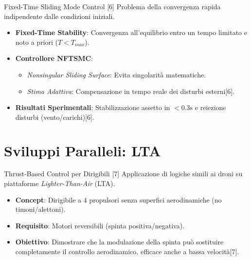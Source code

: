\documentclass[aspectratio=169]{beamer}
\begin{document}
\begin{frame}{Fixed-Time Sliding Mode Control [6]}
    Problema della convergenza rapida indipendente dalle condizioni iniziali.
    \vspace{0.3cm}
    \begin{itemize}
        \item \textbf{Fixed-Time Stability}: Convergenza all'equilibrio entro un tempo limitato e noto a priori ($T < T_{max}$).
        \item \textbf{Controllore NFTSMC}:
        \begin{itemize}
            \item \textit{Nonsingular Sliding Surface}: Evita singolarità matematiche.
            \item \textit{Stima Adattiva}: Compensazione in tempo reale dei disturbi esterni[6].
        \end{itemize}
        \item \textbf{Risultati Sperimentali}: Stabilizzazione assetto in $< 0.3\text{s}$ e reiezione disturbi (vento/carichi)[6].
    \end{itemize}
\end{frame}

\section{Sviluppi Paralleli: LTA}

\begin{frame}{Thrust-Based Control per Dirigibili [7]}
    Applicazione di logiche simili ai droni su piattaforme \textit{Lighter-Than-Air} (LTA).
    \vspace{0.3cm}
    \begin{itemize}
        \item \textbf{Concept}: Dirigibile a 4 propulsori senza superfici aerodinamiche (no timoni/alettoni).
        \item \textbf{Requisito}: Motori reversibili (spinta positiva/negativa).
        \item \textbf{Obiettivo}: Dimostrare che la modulazione della spinta può sostituire completamente il controllo aerodinamico, efficace anche a bassa velocità[7].
    \end{itemize}
\end{frame}
\end{document}
